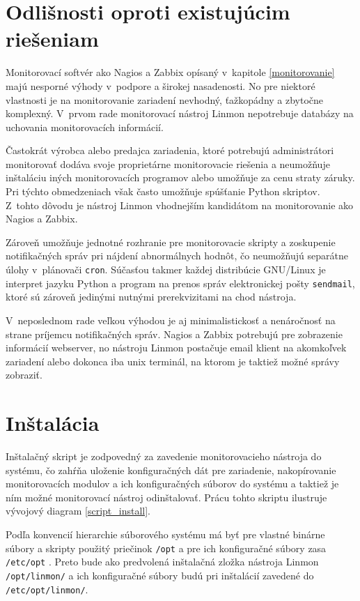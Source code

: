 \section{Odlišnosti oproti existujúcim riešeniam}
Monitorovací softvér ako Nagios a Zabbix opísaný v~kapitole \ref{monitorovanie} majú nesporné výhody v~podpore a širokej nasadenosti. No pre niektoré vlastnosti je na monitorovanie zariadení nevhodný, ťažkopádny a zbytočne komplexný. V~prvom rade monitorovací nástroj Linmon nepotrebuje databázy na uchovania monitorovacích informácií. 

Častokrát výrobca alebo predajca zariadenia, ktoré potrebujú administrátori monitorovať dodáva svoje proprietárne monitorovacie riešenia a neumožňuje inštaláciu iných monitorovacích programov alebo umožňuje za cenu straty záruky. Pri týchto obmedzeniach však často umožňuje spúšťanie Python skriptov. Z~tohto dôvodu je nástroj Linmon vhodnejším kandidátom na monitorovanie ako Nagios a Zabbix. 

Zároveň umožňuje jednotné rozhranie pre monitorovacie skripty a zoskupenie notifikačných správ pri nájdení abnormálnych hodnôt, čo neumožňujú separátne úlohy v~plánovači \texttt{cron}. Súčasťou takmer každej distribúcie GNU/Linux je interpret jazyku Python a  program na prenos správ elektronickej pošty \texttt{sendmail}, ktoré sú zároveň jedinými nutnými prerekvizitami na chod nástroja.

V~neposlednom rade veľkou výhodou je aj minimalistickosť a nenáročnosť na strane príjemcu notifikačných správ. Nagios a Zabbix potrebujú pre zobrazenie informácií webserver, no nástroju Linmon postačuje email klient na akomkoľvek zariadení alebo dokonca iba unix terminál, na ktorom je taktiež možné správy zobraziť. 

\section{Inštalácia}
Inštalačný skript je zodpovedný za zavedenie monitorovacieho nástroja do systému, čo zahŕňa uloženie konfiguračných dát pre zariadenie, nakopírovanie monitorovacích modulov a ich konfiguračných súborov do systému a taktiež je ním možné monitorovací nástroj odinštalovať. Prácu tohto skriptu ilustruje vývojový diagram \ref{script_install}.

Podľa konvencií hierarchie súborového systému má byť pre vlastné binárne súbory a skripty použitý priečinok \texttt{/opt} a pre ich konfiguračné súbory zasa \texttt{/etc/opt} \cite{file-hierarchy}. Preto bude ako predvolená inštalačná zložka nástroja Linmon \texttt{/opt/linmon/} a ich konfiguračné súbory budú pri inštalácií zavedené do \texttt{/etc/opt/linmon/}.  

